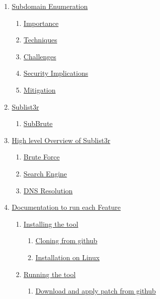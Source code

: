 \documentclass[12pt]{article}
\begin{document}
    \begin{enumerate}
        \item \hyperref[sec:subdomain-enumeration]{Subdomain Enumeration}
        \begin{enumerate}
            \item \hyperref[subsec:importance]{Importance}
            \item \hyperref[subsec:techniques]{Techniques}
            \item \hyperref[subsec:challenges]{Challenges}
            \item \hyperref[subsec:security-implications]{Security Implications}
            \item \hyperref[subsec:mitigation]{Mitigation}
        \end{enumerate}
        \item \hyperref[sec:sublist3r]{Sublist3r}
        \begin{enumerate}
            \item \hyperref[subsec:subbrute]{SubBrute}
        \end{enumerate}
        \item \hyperref[sec:high-level-overview]{High level Overview of Sublist3r}
        \begin{enumerate}
            \item \hyperref[subsec:brute-force]{Brute Force}
            \item \hyperref[subsec:search-engine]{Search Engine}
            \item \hyperref[subsec:dns-resolution]{DNS Resolution}
        \end{enumerate}
        \item \hyperref[sec:documentation]{Documentation to run each Feature}
        \begin{enumerate}
            \item \hyperref[subsec:installing-the-tool]{Installing the tool}
            \begin{enumerate}
                \item \hyperref[subsubsec:cloning-from-github]{Cloning from github}
                \item \hyperref[subsubsec:installation-on-linux]{Installation on Linux}
            \end{enumerate}
            \item \hyperref[subsec:running-the-tool]{Running the tool}
            \begin{enumerate}
                \item \hyperref[subsubsec:download-and-apply-patch-from-github]{Download and apply patch from github}

\end{enumerate}
\end{enumerate}
\end{enumerate}
\end{document}

